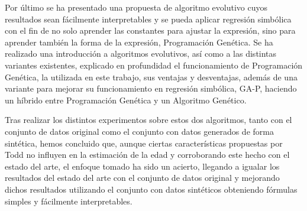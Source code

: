 Por último se ha presentado una propuesta de algoritmo evolutivo cuyos resultados sean fácilmente interpretables y se pueda aplicar regresión simbólica con el fin de no solo aprender las constantes para ajustar la expresión, sino para aprender también la forma de la expresión, Programación Genética. Se ha realizado una introducción a algoritmos evolutivos, así como a las distintas variantes existentes, explicado en profundidad el funcionamiento de Programación Genética, la utilizada en este trabajo, sus ventajas y desventajas, además de una variante para mejorar su funcionamiento en regresión simbólica, GA-P, haciendo un híbrido entre Programación Genética y un Algoritmo Genético.

Tras realizar los distintos experimentos sobre estos dos algoritmos, tanto con el conjunto de datos original como el conjunto con datos generados de forma sintética, hemos concluido que, aunque ciertas características propuestas por Todd no influyen en la estimación de la edad y corroborando este hecho con el estado del arte, el enfoque tomado ha sido un acierto, llegando a igualar los resultados del estado del arte con el conjunto de datos original y mejorando dichos resultados utilizando el conjunto con datos sintéticos obteniendo fórmulas simples y fácilmente interpretables.
